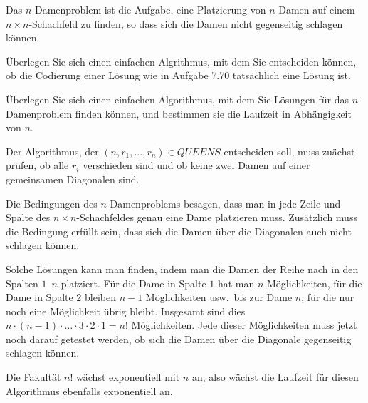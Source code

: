 Das $n$-Damenproblem ist die Aufgabe, eine Platzierung von $n$ Damen auf
einem $n\times n$-Schachfeld zu finden, so dass sich die Damen nicht
gegenseitig schlagen können.
\begin{teilaufgaben}
\item
Überlegen Sie sich einen einfachen Algrithmus, mit dem Sie entscheiden
können, ob die Codierung einer Lösung wie in Aufgabe 7.70 tatsächlich
eine Lösung ist.
\item
Überlegen Sie sich einen einfachen Algorithmus, mit dem Sie Lösungen
für das $n$-Damen\-problem finden können, und bestimmen sie die
Laufzeit in Abhängigkeit von $n$.
\end{teilaufgaben}

\begin{loesung}
\begin{teilaufgaben}
\item
Der Algorithmus, der $(n,r_1,\dots,r_n)\in\textit{QUEENS}$ entscheiden
soll, muss zuächst prüfen, ob alle $r_i$ verschieden sind und
ob keine zwei Damen auf einer gemeinsamen Diagonalen sind.
\item
Die Bedingungen des $n$-Damenproblems besagen, dass man in jede Zeile
und Spalte des $n\times n$-Schachfeldes genau eine Dame platzieren muss.
Zusätzlich muss die Bedingung erfüllt sein, dass sich die Damen über die
Diagonalen auch nicht schlagen können.

Solche Lösungen kann man finden, indem man die Damen 
der Reihe nach in den Spalten $1$--$n$ platziert.
Für die Dame in Spalte $1$ hat man $n$ Möglichkeiten, für die Dame
in Spalte $2$ bleiben $n-1$ Möglichkeiten usw.~bis zur Dame $n$, für
die nur noch eine Möglichkeit übrig bleibt.
Insgesamt sind dies $n\cdot (n-1)\cdot\ldots\cdot 3\cdot 2\cdot 1=n!$
Möglichkeiten.
Jede dieser Möglichkeiten muss jetzt noch darauf getestet werden,
ob sich die Damen über die Diagonale gegenseitig schlagen können.

Die Fakultät $n!$ wächst exponentiell mit $n$ an, also wächst die
Laufzeit für diesen Algorithmus ebenfalls exponentiell an.
\qedhere
\end{teilaufgaben}
\end{loesung}
